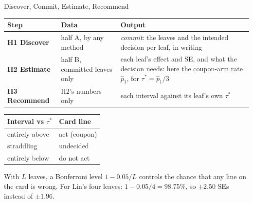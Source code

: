 \documentclass[aspectratio=169, 11pt, handout]{beamer}
\begin{document}
\begin{frame}{Discover, Commit, Estimate, Recommend}

\begin{center}
\small
\begin{tabular}{lp{4.6cm}p{6.0cm}}
\toprule
\textbf{Step} & \textbf{Data} & \textbf{Output} \\
\midrule
\textbf{H1 Discover} & half A, by any method & \emph{commit}: the leaves and the intended decision per leaf, in writing \\[0.3em]
\textbf{H2 Estimate} & half B, committed leaves only & each leaf's effect and SE, and what the decision needs: here the coupon-arm rate $\hat p_1$, for $\tau^\ast = \hat p_1/3$ \\[0.3em]
\textbf{H3 Recommend} & H2's numbers only & each interval against its leaf's own $\tau^\ast$ \\
\bottomrule
\end{tabular}
\end{center}

\medskip

\begin{center}
\small
\begin{tabular}{ll}
\toprule
\textbf{Interval vs $\tau^\ast$} & \textbf{Card line} \\
\midrule
entirely above & act (coupon) \\
straddling & undecided \\
entirely below & do not act \\
\bottomrule
\end{tabular}
\end{center}

\medskip

With $L$ leaves, a Bonferroni level $1 - 0.05/L$ controls the chance that any line on the card is wrong. For Lin's four leaves: $1 - 0.05/4 = 98.75\%$, so $\pm 2.50$ SEs instead of $\pm 1.96$.
\end{frame}
\end{document}
